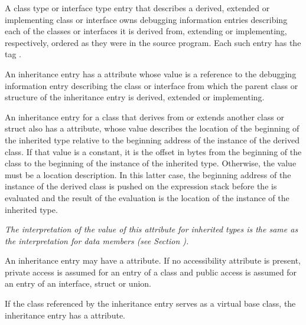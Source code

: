 A class type or interface type entry that describes a
derived, extended or implementing class or interface owns
debugging information entries describing each of the classes
or interfaces it is derived from, extending or implementing,
respectively, ordered as they were in the source program. Each
such entry has 
the 
tag \DWTAGinheritanceTARG.

An inheritance entry 
has 
a 
\DWATtype{} attribute whose value is
a reference to the debugging information entry describing the
class or interface from which the parent class or structure
of the inheritance entry is derived, extended or implementing.

An inheritance entry 
for a class that derives from or extends
\hypertarget{chap:DWATdatamemberlocationinheritedmemberlocation}{}
another class or struct also has 
a 
\DWATdatamemberlocation{}
attribute, whose value describes the location of the beginning
of the inherited type relative to the beginning address of the
instance of the derived class. If that value is a constant, it is the offset
in bytes from the beginning of the class to the beginning of
the instance of the inherited type. Otherwise, the value must be a location
description. In this latter case, the beginning address of
the instance of the derived class is pushed on the expression stack before
the 
is evaluated and the result of the
evaluation is the location of the instance of the inherited type.

\textit{The interpretation of the value of this attribute for
inherited types is the same as the interpretation for data
members 
(see Section ).  }

An 
inheritance entry 
\hypertarget{chap:DWATaccessibilitycppinheritedmembers}{}
may 
have a
\DWATaccessibility{}
attribute. 
If no accessibility attribute
is present, private access is assumed for an entry of a class
and public access is assumed for an entry of an interface,
struct or union.

If 
\hypertarget{chap:DWATvirtualityvirtualityofbaseclass}{}
the class referenced by the 
inheritance entry serves
as a  virtual base class, the inheritance entry has a
\DWATvirtuality{} attribute.

